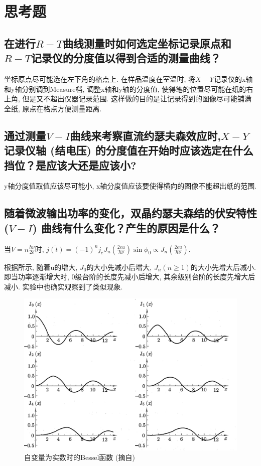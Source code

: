 \documentclass[font=default]{mpltx}
\begin{document}


\clearpage %
\appendix %
\section{思考题}\label{app:exercise}
\subsection{在进行$R-T$曲线测量时如何选定坐标记录原点和$R-T$记录仪的分度值以得到合适的测量曲线？}
坐标原点尽可能选在左下角的格点上. 在样品温度在室温时, 将$X-Y$记录仪的x轴和y轴分别调到Measure档, 调整x轴和y轴的分度值, 使得笔的位置尽可能在纸的右上角, 但是又不超出仪器记录范围.
这样做的目的是让记录得到的图像尽可能铺满全纸, 原点在格点方便测量距离.
\subsection{通过测量$V-I$曲线来考察直流约瑟夫森效应时,$X-Y$记录仪轴 (结电压) 的分度值在开始时应该选定在什么挡位？是应该大还是应该小? }
y轴分度值取值应该尽可能小, x轴分度值应该要使得横向的图像不能超出纸的范围. 
\subsection{随着微波输出功率的变化，双晶约瑟夫森结的伏安特性 ($V-I$) 曲线有什么变化？产生的原因是什么？}
当$ V = n\frac{h\nu}{2e}$时, $\bar{j(t)} = (-1)^nj_cJ_n(\frac{2eu}{h\nu})\sin{\phi_0}\propto J_n(\frac{2eu}{h\nu})$.
\par
根据所示, 随着u的增大, $J_0$的大小先减小后增大, $J_n (n\ge 1)$的大小先增大后减小. 即当功率逐渐增大时, 0级台阶的长度先减小后增大, 其余级别台阶的长度先增大后减小.
实验中也确实观察到了类似现象.
\begin{figure}
    \centering
    \includegraphics[width=0.85\linewidth]{fig/7.png}
    \caption{自变量为实数时的Bessel函数 (摘自\cite{shulifangfa})}
    \label{fig:Bessel}
\end{figure}
\end{document}

